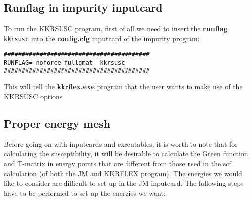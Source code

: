 \documentclass[11pt,fleqn]{book} %
\begin{document}
\subsection{Runflag in impurity inputcard}



To run the KKRSUSC program, first of all we need to insert the \textbf{runflag} \verb|kkrsusc|
into the \textbf{config.cfg} inputcard of the impurity program:
\begin{VBox}
\begin{verbatim}
#########################################
RUNFLAG= noforce_fullgmat  kkrsusc
#########################################
\end{verbatim}
\end{VBox}
This will tell the \textbf{kkrflex.exe} program that the user wants to make use of the
KKRSUSC options.


\subsection{Proper energy mesh}
\label{subsec:emeshdat}


Before going on with inputcards and executables, it is worth to
note that for calculating the susceptibility,
it will be desirable to calculate
the Green function and T-matrix in
energy points that are different from those used in the scf
calculation (of both the JM and KKRFLEX program).
The energies we would like to consider are
difficult to set up in
the JM inputcard.
The following steps have to be performed
to set up the energies we want:
\end{document}
